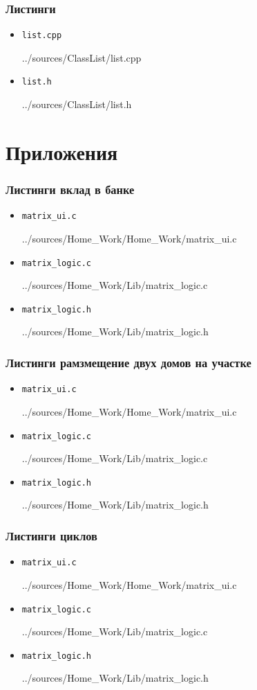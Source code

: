 \documentclass[12pt,a4paper]{report}
\begin{document}
\subsection*{Листинги}
\begin{itemize}
\item[] \verb-list.cpp-

{../sources/ClassList/list.cpp}

\item[] \verb-list.h-

{../sources/ClassList/list.h}
\end{itemize}

\chapter{Приложения}

\subsection*{Листинги вклад в банке}
\begin{itemize}
\item[] \verb-matrix_ui.c-

{../sources/Home_Work/Home_Work/matrix_ui.c}

\item[] \verb-matrix_logic.c-

{../sources/Home_Work/Lib/matrix_logic.c}

\item[] \verb-matrix_logic.h-

{../sources/Home_Work/Lib/matrix_logic.h}
\end{itemize}

\subsection*{Листинги рамзмещение двух домов на участке}
\begin{itemize}
\item[] \verb-matrix_ui.c-

{../sources/Home_Work/Home_Work/matrix_ui.c}

\item[] \verb-matrix_logic.c-

{../sources/Home_Work/Lib/matrix_logic.c}

\item[] \verb-matrix_logic.h-

{../sources/Home_Work/Lib/matrix_logic.h}
\end{itemize}

\subsection*{Листинги циклов}
\begin{itemize}
\item[] \verb-matrix_ui.c-

{../sources/Home_Work/Home_Work/matrix_ui.c}

\item[] \verb-matrix_logic.c-

{../sources/Home_Work/Lib/matrix_logic.c}

\item[] \verb-matrix_logic.h-

{../sources/Home_Work/Lib/matrix_logic.h}
\end{itemize}
\end{document}
